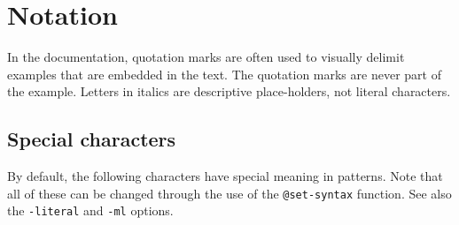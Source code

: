 
\section{Notation}

In the documentation, quotation marks are often used to visually delimit
examples that are embedded in the text.  The quotation marks are never part
of the example.
Letters in italics are descriptive place-holders, not literal characters.

\subsection{Special characters}
By default, the following characters have special meaning in patterns.
Note that all of these can be changed through the use of the
\verb/@set-syntax/ function.  See also the \verb/-literal/ and
\verb/-ml/ options.

